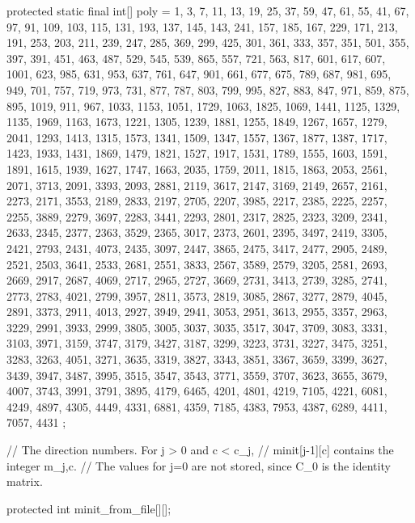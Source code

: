 \begin{code}
\begin{hide}
    protected static final int[] poly = {
     1, 3, 7, 11, 13, 19, 25, 37, 59,
     47, 61, 55, 41, 67, 97, 91, 109, 103, 
     115, 131, 193, 137, 145, 143, 241, 157, 185, 
     167, 229, 171, 213, 191, 253, 203, 211, 239, 
     247, 285, 369, 299, 425, 301, 361, 333, 357, 
     351, 501, 355, 397, 391, 451, 463, 487, 529, 
     545, 539, 865, 557, 721, 563, 817, 601, 617, 
     607, 1001, 623, 985, 631, 953, 637, 761, 647, 
     901, 661, 677, 675, 789, 687, 981, 695, 949, 
     701, 757, 719, 973, 731, 877, 787, 803, 799, 
     995, 827, 883, 847, 971, 859, 875, 895, 1019, 
     911, 967, 1033, 1153, 1051, 1729, 1063, 1825, 1069, 
     1441, 1125, 1329, 1135, 1969, 1163, 1673, 1221, 1305, 
     1239, 1881, 1255, 1849, 1267, 1657, 1279, 2041, 1293, 
     1413, 1315, 1573, 1341, 1509, 1347, 1557, 1367, 1877, 
     1387, 1717, 1423, 1933, 1431, 1869, 1479, 1821, 1527, 
     1917, 1531, 1789, 1555, 1603, 1591, 1891, 1615, 1939, 
     1627, 1747, 1663, 2035, 1759, 2011, 1815, 1863, 2053, 
     2561, 2071, 3713, 2091, 3393, 2093, 2881, 2119, 3617, 
     2147, 3169, 2149, 2657, 2161, 2273, 2171, 3553, 2189, 
     2833, 2197, 2705, 2207, 3985, 2217, 2385, 2225, 2257, 
     2255, 3889, 2279, 3697, 2283, 3441, 2293, 2801, 2317, 
     2825, 2323, 3209, 2341, 2633, 2345, 2377, 2363, 3529, 
     2365, 3017, 2373, 2601, 2395, 3497, 2419, 3305, 2421, 
     2793, 2431, 4073, 2435, 3097, 2447, 3865, 2475, 3417, 
     2477, 2905, 2489, 2521, 2503, 3641, 2533, 2681, 2551, 
     3833, 2567, 3589, 2579, 3205, 2581, 2693, 2669, 2917, 
     2687, 4069, 2717, 2965, 2727, 3669, 2731, 3413, 2739, 
     3285, 2741, 2773, 2783, 4021, 2799, 3957, 2811, 3573, 
     2819, 3085, 2867, 3277, 2879, 4045, 2891, 3373, 2911, 
     4013, 2927, 3949, 2941, 3053, 2951, 3613, 2955, 3357, 
     2963, 3229, 2991, 3933, 2999, 3805, 3005, 3037, 3035, 
     3517, 3047, 3709, 3083, 3331, 3103, 3971, 3159, 3747, 
     3179, 3427, 3187, 3299, 3223, 3731, 3227, 3475, 3251, 
     3283, 3263, 4051, 3271, 3635, 3319, 3827, 3343, 3851, 
     3367, 3659, 3399, 3627, 3439, 3947, 3487, 3995, 3515, 
     3547, 3543, 3771, 3559, 3707, 3623, 3655, 3679, 4007, 
     3743, 3991, 3791, 3895, 4179, 6465, 4201, 4801, 4219, 
     7105, 4221, 6081, 4249, 4897, 4305, 4449, 4331, 6881, 
     4359, 7185, 4383, 7953, 4387, 6289, 4411, 7057, 4431
     };


    // The direction numbers.  For j > 0 and c < c_j,
    // minit[j-1][c] contains the integer m_{j,c}.
    // The values for j=0 are not stored, since C_0 is the identity matrix.

   protected int minit_from_file[][];


\end{hide}
\end{code}
